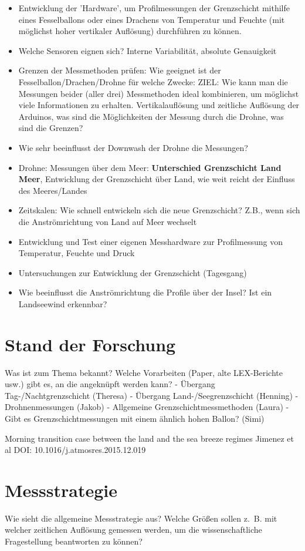 \documentclass[a4paper,11pt,DIV=calc,tablecaptionabove,headinclude,twoside]{article}
\begin{document}
\begin{itemize}
\item Entwicklung der 'Hardware', um Profilmessungen der Grenzschicht mithilfe eines Fesselballons oder eines Drachens von Temperatur und Feuchte (mit möglichst hoher vertikaler Auflösung) durchführen zu können.
\item Welche Sensoren eignen sich? Interne Variabilität, absolute Genauigkeit
\item Grenzen der Messmethoden prüfen: Wie geeignet ist der Fesselballon/Drachen/Drohne für welche Zwecke: ZIEL: Wie kann man die Messungen beider (aller drei) Messmethoden ideal kombinieren, um möglichst viele Informationen zu erhalten. Vertikalauflösung und zeitliche Auflösung der Arduinos, was sind die Möglichkeiten der Messung durch die Drohne, was sind die Grenzen?
\item Wie sehr beeinflusst der Downwash der Drohne die Messungen?
\item Drohne: Messungen über dem Meer: \textbf{Unterschied Grenzschicht Land Meer}, Entwicklung der Grenzschicht über Land, wie weit reicht der Einfluss des Meeres/Landes
\item Zeitskalen: Wie schnell entwickeln sich die neue Grenzschicht? Z.B., wenn sich die Anströmrichtung von Land auf Meer wechselt
\item Entwicklung und Test einer eigenen Messhardware zur Profilmessung von
    Temperatur, Feuchte und Druck
\item Untersuchungen zur Entwicklung der Grenzschicht (Tagesgang)
\item Wie beeinflusst die Anströmrichtung die Profile über der Insel? Ist ein
    Landseewind erkennbar?
\end{itemize}

\section{Stand der Forschung}
Was ist zum Thema bekannt? Welche Vorarbeiten (Paper, alte LEX-Berichte usw.) gibt es, an die angeknüpft werden kann?
- Übergang Tag-/Nachtgrenzschicht (Theresa)
- Übergang Land-/Seegrenzschicht (Henning)
- Drohnenmessungen (Jakob)
- Allgemeine Grenzschichtmessmethoden (Laura)
- Gibt es Grenzschichtmessungen mit einem ähnlich hohen Ballon? (Simi)

Morning transition case between the land and the sea breeze regimes Jimenez et
al
DOI: 10.1016/j.atmosres.2015.12.019

\section{Messstrategie}
Wie sieht die allgemeine Messstrategie aus? Welche Größen sollen z.~B. mit welcher zeitlichen Auflösung gemessen werden, um die wissenschaftliche Fragestellung beantworten zu können?
\end{document}
